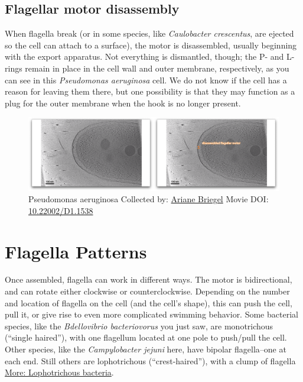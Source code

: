 \documentclass[]{tufte-book}
\begin{document}
\hypertarget{Flagellar_motor_disassembly}{\subsection{Flagellar motor
disassembly}\label{Flagellar_motor_disassembly}}

When flagella break (or in some species, like \emph{Caulobacter
crescentus}, are ejected so the cell can attach to a surface), the motor
is disassembled, usually beginning with the export apparatus. Not
everything is dismantled, though; the P- and L-rings remain in place in
the cell wall and outer membrane, respectively, as you can see in this
\emph{Pseudomonas aeruginosa} cell. We do not know if the cell has a
reason for leaving them there, but one possibility is that they may
function as a plug for the outer membrane when the hook is no longer
present.





\begin{figure}
\includegraphics{movie_stills/6_3a} \caption[Pseudomonas aeruginosa Collected by:
\protect\hyperlink{ariane_briegel}{Ariane Briegel} Movie DOI:
\href{https://doi.org/10.22002/D1.1538}{10.22002/D1.1538}]{Pseudomonas aeruginosa Collected by:
\protect\hyperlink{ariane_briegel}{Ariane Briegel} Movie DOI:
\href{https://doi.org/10.22002/D1.1538}{10.22002/D1.1538}}\label{fig:6-3a}
\end{figure}

\section{Flagella Patterns}\label{flagella-patterns}

Once assembled, flagella can work in different ways. The motor is
bidirectional, and can rotate either clockwise or counterclockwise.
Depending on the number and location of flagella on the cell (and the
cell's shape), this can push the cell, pull it, or give rise to even
more complicated swimming behavior. Some bacterial species, like the
\emph{Bdellovibrio bacteriovorus} you just saw, are monotrichous
(``single haired''), with one flagellum located at one pole to push/pull
the cell. Other species, like the \emph{Campylobacter jejuni} here, have
bipolar flagella--one at each end. Still others are lophotrichous
(``crest-haired''), with a clump of flagella
\protect\hyperlink{Lophotrichous_bacteria}{More: Lophotrichous
bacteria}.
\end{document}
